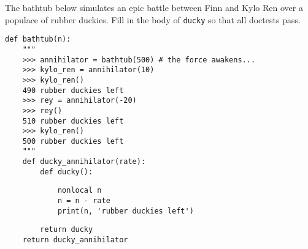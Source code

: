 \begin{blocksection}
\question The bathtub below simulates an epic battle between Finn and Kylo
Ren over a populace of rubber duckies. Fill in the body of \texttt{ducky} so
that all doctests pass.

\begin{lstlisting}
def bathtub(n):
    """
    >>> annihilator = bathtub(500) # the force awakens...
    >>> kylo_ren = annihilator(10)
    >>> kylo_ren()
    490 rubber duckies left
    >>> rey = annihilator(-20)
    >>> rey()
    510 rubber duckies left
    >>> kylo_ren()
    500 rubber duckies left
    """
    def ducky_annihilator(rate):
        def ducky():
\end{lstlisting}
\begin{solution}[1.5in]
  \begin{lstlisting}
            nonlocal n
            n = n - rate
            print(n, 'rubber duckies left')
  \end{lstlisting}
\end{solution}
\begin{lstlisting}
        return ducky
    return ducky_annihilator
\end{lstlisting}
\end{blocksection}
